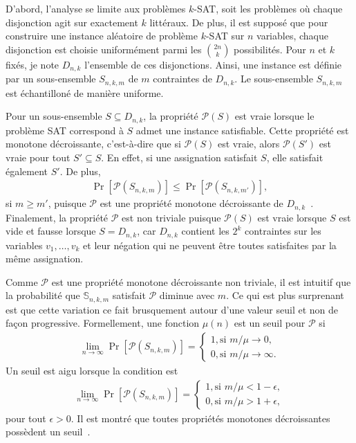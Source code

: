 D'abord,
l'analyse se limite aux problèmes $k$-SAT,
soit les problèmes où chaque disjonction agit sur exactement $k$ littéraux.
De plus,
il est supposé que pour construire une instance aléatoire de problème $k$-SAT sur $n$ variables,
chaque disjonction est choisie uniformément parmi les $\binom{2n}{k}$ possibilités.
Pour $n$ et $k$ fixés, je note $D_{n,k}$ l'ensemble de ces disjonctions.
Ainsi, une instance est définie par un sous-ensemble $S_{n,k,m}$ de $m$ contraintes de $D_{n, k}$.
Le sous-ensemble $S_{n, k, m}$ est échantilloné de manière uniforme. 

Pour un sous-ensemble $S \subseteq D_{n, k}$,
la propriété $\mathcal P(S)$ est vraie lorsque le problème SAT correspond à $S$
admet une instance satisfiable.
Cette propriété est monotone décroissante,
c'est-à-dire que si $\mathcal P(S)$ est vraie,
alors $\mathcal P(S')$ est vraie pour tout $S' \subseteq S$.
En effet,
si une assignation satisfait $S$, elle satisfait également $S'$.
De plus,
\begin{align}
  \Pr[\mathcal P(S_{n, k, m})] \leq 
  \Pr[\mathcal P(S_{n, k, m'})],
\end{align}
si $m \geq m'$,
puisque $\mathcal P$ est une propriété monotone décroissante 
de $D_{n, k}$~\cite{bollobas_threshold_1987}.
Finalement, la propriété $\mathcal P$ est non triviale puisque
$\mathcal P(S)$ est vraie lorsque $S$ est vide et fausse lorsque $S = D_{n, k}$,
car $D_{n, k}$ contient les $2^k$ contraintes
sur les variables $v_1, \ldots, v_k$ et leur négation
qui ne peuvent être toutes satisfaites par la même assignation.

Comme $\mathcal P$ est une propriété monotone décroissante non triviale,
il est intuitif que la probabilité que $\mathbb S_{n,k,m}$ satisfait 
$\mathcal P$ diminue avec $m$.
Ce qui est plus surprenant est que cette variation ce fait brusquement 
autour d'une valeur seuil et non de façon progressive.
Formellement,
une fonction $\mu(n)$ est un seuil pour $\mathcal P$ si 
\begin{align}
  \lim_{n \to \infty} \Pr[\mathcal P(S_{n,k,m})] 
  =
  \begin{cases}
    1, \text{si } m / \mu \to 0, \\
    0, \text{si } m / \mu \to \infty.
  \end{cases}
\end{align}
Un seuil est aigu lorsque la condition est 
\begin{align}
  \lim_{n \to \infty} \Pr[\mathcal P(S_{n,k,m})] 
  =
  \begin{cases}
    1, \text{si } m / \mu < 1 - \epsilon, \\
    0, \text{si } m / \mu > 1 + \epsilon,
  \end{cases}
\end{align}
pour tout $\epsilon > 0$.
Il est montré que toutes propriétés monotones décroissantes
possèdent un seuil~\cite{bollobas_threshold_1987}.

